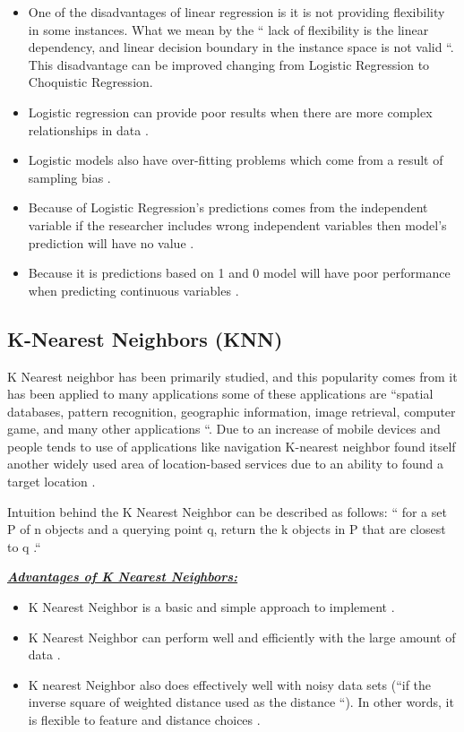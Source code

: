 \documentclass[sigconf]{acmart}
\begin{document}
\begin{itemize}
\item One of the disadvantages of linear regression is it is not providing flexibility in some instances. What we mean by the `` lack of flexibility is the linear dependency, and linear decision boundary in the instance space is not valid \cite{www-old.cs}``. This disadvantage can be improved changing from Logistic Regression to Choquistic Regression\cite{www-old.cs}.
\item Logistic regression can provide poor results when there are more complex relationships in data \cite{www-elitedatascience}.
\item Logistic models also have over-fitting problems which come from a result of sampling bias \cite{www-classroom}.
\item Because of Logistic Regression's predictions comes from the independent variable if the researcher includes wrong independent variables then model's prediction will have no value \cite{www-classroom}.
\item Because it is predictions based on 1 and 0 model will have poor performance when predicting continuous variables \cite{www-classroom}. 
\end{itemize}


\subsection{K-Nearest Neighbors (KNN)}
K Nearest neighbor has been primarily studied, and this popularity comes from it has been applied to many applications some of these applications are ``spatial databases, pattern recognition, geographic information, image retrieval, computer game, and many other applications \cite{Lee2017-knn}``. Due to an increase of mobile devices and people tends to use of applications like navigation K-nearest neighbor found itself another widely used area of location-based services due to an ability to found a target location \cite{Lee2017-knn}. 

\par Intuition behind the K Nearest Neighbor can be described as follows: `` for a set P of n objects and a querying point q, return the k objects in P that are closest to q \cite{Lee2017-knn}.``


\textbf{\underline{\textit{Advantages of K Nearest Neighbors:}}}
\begin{itemize}
\item K Nearest Neighbor is a basic and simple approach to implement \cite{www-cs.man}.
\item K Nearest Neighbor can perform well and efficiently with the large amount of data \cite{www-revoledu}.
\item K nearest Neighbor also does effectively well with noisy data sets (``if the inverse square of weighted distance used as the distance \cite{www-revoledu}``). In other words, it is flexible to feature and distance choices \cite{www-cs.man}.
\end{itemize}
\end{document}
